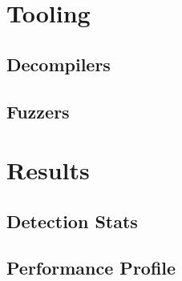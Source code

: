 \part{Tooling} \label{sec:evasion}
\chapter{Decompilers} \label{ch:decompilers}

\chapter{Fuzzers} \label{ch:fuzzers}



\part{Results}
\chapter{Detection Stats} \label{ch:stats}

\chapter{Performance Profile} \label{ch:profiling}


% 



